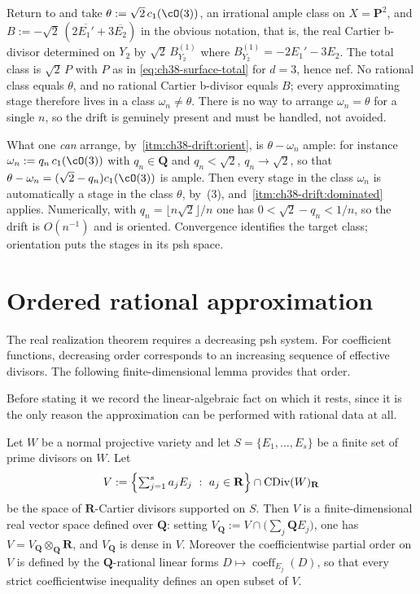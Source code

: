 \begin{example}
\label{ex:ch38-drift-irrational}
Return to  and take
$\theta:=\sqrt2\,c_1(\cO(3))$, an irrational ample class on
$X=\mathbf P^2$, and $B:=-\sqrt2\,(2\overline{E_1'}+3\overline{E_2})$
in the obvious notation, that is, the real Cartier b-divisor determined on
$Y_2$ by $\sqrt2\,B_{Y_2}^{(1)}$ where
$B_{Y_2}^{(1)}=-2E_1'-3E_2$.  The total class is
$\sqrt2\,P$ with $P$ as in \eqref{eq:ch38-surface-total} for
$d=3$, hence nef.  No rational class equals $\theta$, and no rational
Cartier b-divisor equals $B$; every approximating stage therefore lives
in a class $\omega_n\neq\theta$.  There is no way to arrange
$\omega_n=\theta$ for a single $n$, so the drift is genuinely present
and must be handled, not avoided.

What one \emph{can} arrange, by
\,\cref{itm:ch38-drift:orient}, is
$\theta-\omega_n$ ample: for instance
$\omega_n:=q_n\,c_1(\cO(3))$ with $q_n\in\mathbf Q$ and
$q_n<\sqrt2$, $q_n\to\sqrt2$, so that
$\theta-\omega_n=(\sqrt2-q_n)c_1(\cO(3))$ is ample.  Then every stage in
the class $\omega_n$ is automatically a stage in the class $\theta$,
by \,(3), and
\,\cref{itm:ch38-drift:dominated} applies.
Numerically, with $q_n=\lfloor n\sqrt2\rfloor/n$ one has
$0<\sqrt2-q_n<1/n$, so the drift is $O(n^{-1})$ and is oriented. Convergence identifies
the target class; orientation puts the stages in its psh space.
\end{example}

\section{Ordered rational approximation}
\label{sec:ch38-approximation}

The real realization theorem requires a decreasing psh system.  For
coefficient functions, decreasing order corresponds to an increasing
sequence of effective divisors.  The following finite-dimensional lemma
provides that order.

Before stating it we record the linear-algebraic fact on which it rests,
since it is the only reason the approximation can be performed with
rational data at all.

\begin{lemma}
\label{lem:ch38-fixed-support-rational}
Let $W$ be a normal projective variety and let
$S=\{E_1,\ldots,E_s\}$ be a finite set of prime divisors on $W$.  Let
\[
 V:=\Bigl\{\textstyle\sum_{j=1}^sa_jE_j\ :\ a_j\in\mathbf R\Bigr\}
 \cap\operatorname{CDiv}(W)_{\mathbf R}
\]
be the space of $\mathbf R$-Cartier divisors supported on $S$.  Then
$V$ is a finite-dimensional real vector space defined over
$\mathbf Q$: setting $V_{\mathbf Q}:=V\cap\bigl(\sum_j\mathbf QE_j\bigr)$,
one has $V=V_{\mathbf Q}\otimes_{\mathbf Q}\mathbf R$, and
$V_{\mathbf Q}$ is dense in $V$.  Moreover the coefficientwise partial
order on $V$ is defined by the $\mathbf Q$-rational linear forms
$D\mapsto\operatorname{coeff}_{E_j}(D)$, so that every strict
coefficientwise inequality defines an open subset of $V$.
\end{lemma}

